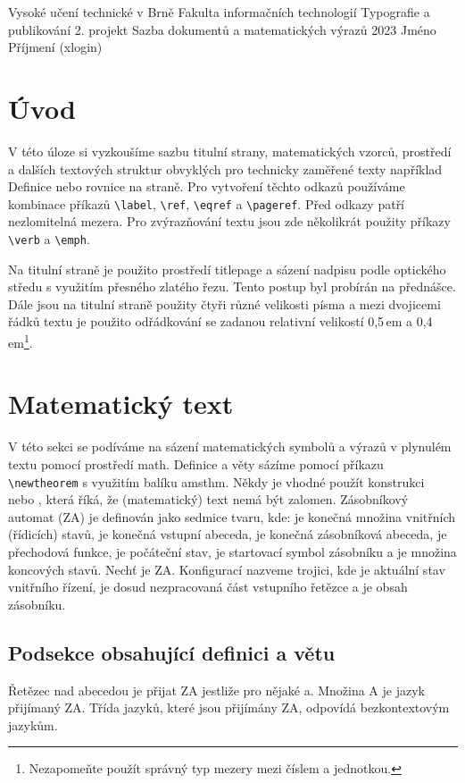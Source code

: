 \documentclass[a4paper,twocolumn,11pt]{article}[06-03-2022]
\begin{document}
\begin{titlepage}
    Vysoké učení technické v Brně Fakulta informačních technologií Typografie a publikování 2. projekt Sazba dokumentů a matematických výrazů 2023 Jméno Příjmení (xlogin)    
\end{titlepage}


\section*{Úvod}
V této úloze si vyzkoušíme sazbu titulní strany, matematických vzorců, prostředí a dalších textových struktur obvyklých pro technicky zaměřené texty například Definice nebo rovnice na straně. Pro vytvoření těchto odkazů používáme kombinace příkazů \verb|\label|, \verb|\ref|, \verb|\eqref| a \verb|\pageref|. Před odkazy patří nezlomitelná mezera. Pro zvýrazňování textu jsou zde několikrát použity příkazy \verb|\verb| a \verb|\emph|. 

Na titulní straně je použito prostředí titlepage a sázení nadpisu podle optického středu s využitím přesného zlatého řezu. Tento postup byl probírán na přednášce. Dále jsou na titulní straně použity čtyři různé velikosti písma a mezi dvojicemi řádků textu je použito odřádkování se zadanou relativní velikostí 0,5\,em a 0,4\,em\footnote{Nezapomeňte použít správný typ mezery mezi číslem a jednotkou.}.

\section{Matematický text}
V této sekci se podíváme na sázení matematických symbolů a výrazů v plynulém textu pomocí prostředí math. Definice a věty sázíme pomocí příkazu \verb|\newtheorem| s využitím balíku amsthm. Někdy je vhodné použít konstrukci ${}$ nebo \mbox{}, která říká, že (matematický) text nemá být zalomen. Zásobníkový automat (ZA) je definován jako sedmice tvaru, kde: je konečná množina vnitřních (řídicích) stavů, je konečná vstupní abeceda, je konečná zásobníková abeceda, je přechodová funkce, je počáteční stav, je startovací symbol zásobníku a je množina koncových stavů. Nechť je ZA. Konfigurací nazveme trojici, kde je aktuální stav vnitřního řízení, je dosud nezpracovaná část vstupního řetězce a je obsah zásobníku.

\subsection{Podsekce obsahující definici a větu}
Řetězec nad abecedou je přijat ZA jestliže pro nějaké a. Množina A je jazyk přijímaný ZA. Třída jazyků, které jsou přijímány ZA, odpovídá bezkontextovým jazykům.
\end{document}
